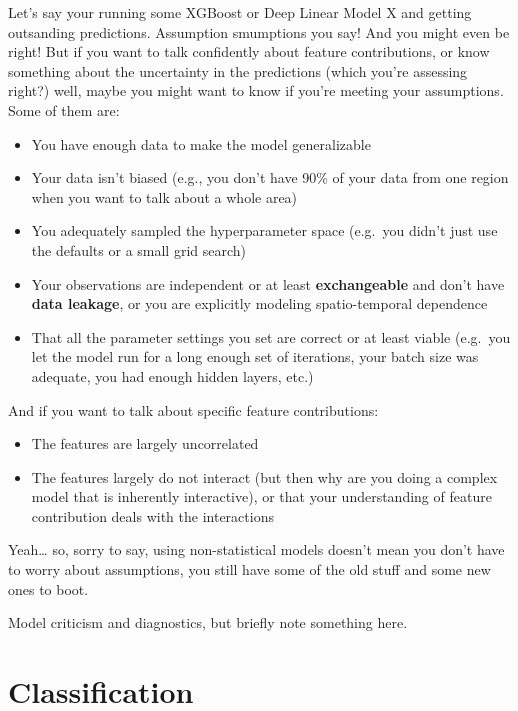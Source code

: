 \documentclass[
  letterpaper,
]{krantz}
\providecommand{\tightlist}{%
  \setlength{\itemsep}{0pt}\setlength{\parskip}{0pt}}\usepackage{longtable,booktabs,array}
\begin{document}
Let's say your running some XGBoost or Deep Linear Model X and getting
outsanding predictions. Assumption smumptions you say! And you might
even be right! But if you want to talk confidently about feature
contributions, or know something about the uncertainty in the
predictions (which you're assessing right?) well, maybe you might want
to know if you're meeting your assumptions. Some of them are:

\begin{itemize}
\tightlist
\item
  You have enough data to make the model generalizable
\item
  Your data isn't biased (e.g., you don't have 90\% of your data from
  one region when you want to talk about a whole area)
\item
  You adequately sampled the hyperparameter space (e.g.~you didn't just
  use the defaults or a small grid search)
\item
  Your observations are independent or at least \textbf{exchangeable}
  and don't have \textbf{data leakage}, or you are explicitly modeling
  spatio-temporal dependence
\item
  That all the parameter settings you set are correct or at least viable
  (e.g.~you let the model run for a long enough set of iterations, your
  batch size was adequate, you had enough hidden layers, etc.)
\end{itemize}

And if you want to talk about specific feature contributions:

\begin{itemize}
\tightlist
\item
  The features are largely uncorrelated
\item
  The features largely do not interact (but then why are you doing a
  complex model that is inherently interactive), or that your
  understanding of feature contribution deals with the interactions
\end{itemize}

Yeah\ldots{} so, sorry to say, using non-statistical models doesn't mean
you don't have to worry about assumptions, you still have some of the
old stuff and some new ones to boot.

Model criticism and diagnostics, but briefly note something here.

\section{Classification}\label{classification}
\end{document}
